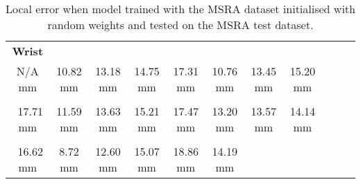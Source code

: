     \begin{table}[!ht]
    \begin{tabular}{|c|c|c|c|c|c|c|c|c|c|c|}
    \hline
    {\bfseries Wrist} & \cellcolor[HTML]{40ff00}{\bfseries IMCP} & \cellcolor[HTML]{40ff00}{\bfseries IPIP} & \cellcolor[HTML]{40ff00}{\bfseries IDIP} & \cellcolor[HTML]{40ff00}{\bfseries ITIP} & \cellcolor[HTML]{40ff00}{\bfseries MMCP} & \cellcolor[HTML]{40ff00}{\bfseries MPIP} & \cellcolor[HTML]{40ff00}{\bfseries MDIP}  \\
    N/A mm & \cellcolor[HTML]{40ff00}$\,\,\,$10.82 mm & \cellcolor[HTML]{40ff00}$\,\,\,$13.18 mm & \cellcolor[HTML]{40ff00}$\,\,\,$14.75 mm & \cellcolor[HTML]{40ff00}$\,\,\,$17.31 mm & \cellcolor[HTML]{40ff00}$\,\,\,$10.76 mm & \cellcolor[HTML]{40ff00}$\,\,\,$13.45 mm & \cellcolor[HTML]{40ff00}$\,\,\,$15.20 mm\\
    \hline
    \cellcolor[HTML]{40ff00}{\bfseries MTIP} & \cellcolor[HTML]{40ff00}{\bfseries RMCP} & \cellcolor[HTML]{40ff00}{\bfseries RPIP} & \cellcolor[HTML]{40ff00}{\bfseries RDIP} & \cellcolor[HTML]{40ff00}{\bfseries RTIP} & \cellcolor[HTML]{40ff00}{\bfseries PMCP} & \cellcolor[HTML]{40ff00}{\bfseries PPIP} & \cellcolor[HTML]{40ff00}{\bfseries PDIP}  \\
    \cellcolor[HTML]{40ff00}$\,\,\,$17.71 mm & \cellcolor[HTML]{40ff00}$\,\,\,$11.59 mm & \cellcolor[HTML]{40ff00}$\,\,\,$13.63 mm & \cellcolor[HTML]{40ff00}$\,\,\,$15.21 mm & \cellcolor[HTML]{40ff00}$\,\,\,$17.47 mm & \cellcolor[HTML]{40ff00}$\,\,\,$13.20 mm & \cellcolor[HTML]{40ff00}$\,\,\,$13.57 mm & \cellcolor[HTML]{40ff00}$\,\,\,$14.14 mm\\
    \hline
    \cellcolor[HTML]{40ff00}{\bfseries PTIP} & \cellcolor[HTML]{00ff00}{\bfseries TMCP} & \cellcolor[HTML]{40ff00}{\bfseries TPIP} & \cellcolor[HTML]{40ff00}{\bfseries PDIP} & \cellcolor[HTML]{40ff00}{\bfseries TTIP} & \cellcolor[HTML]{40ff00}{\bfseries Average}  \\
    \cellcolor[HTML]{40ff00}$\,\,\,$16.62 mm & \cellcolor[HTML]{00ff00}$\,\,\,\,\,\,$8.72 mm & \cellcolor[HTML]{40ff00}$\,\,\,$12.60 mm & \cellcolor[HTML]{40ff00}$\,\,\,$15.07 mm & \cellcolor[HTML]{40ff00}$\,\,\,$18.86 mm & \cellcolor[HTML]{40ff00}$\,\,\,$14.19 mm \\
    \cline{1-6}
    \end{tabular}
    \caption{Local error when model trained with the MSRA dataset initialised with random weights and tested on the MSRA test dataset.}
    \label{tb:baseline_msra:l}
    \end{table}